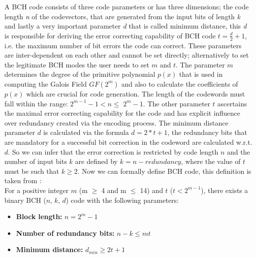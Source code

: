 A BCH code consists of three code parameters or has three dimensions; the code length \emph{n} of the codevectors, that are generated from the input bits of length \emph{k} and lastly a very important parameter \emph{d} that is called minimum distance, this \emph{d} is responsible for deriving the error correcting capability of BCH code $t = \frac{d}{2} + 1$, i.e. the maximum number of bit errors the code can correct. These parameters are inter-dependent on each other
and cannot be set directly; alternatively to set the legitimate BCH modes the user needs to set $m$ and $t$. The parameter $m$ determines the degree of the primitive polynomial $p(x)$ that is used in computing the Galois Field $GF(2^m)$ and also to calculate the coefficients of $p(x)$ which are crucial for code generation. The length of the codewords must fall within the range: $2^{m-1} - 1 < n \leq$ $2^m - 1$. The other parameter $t$ ascertains the maximal error correcting capability
for the code and has explicit influence over redundancy created via the encoding process. The minimum distance parameter $d$ is calculated via the formula $d = 2 * t + 1$, the redundancy bits that are mandatory for a successful bit correction in the codeword are calculated w.r.t. $d$. So we can infer that the error correction is restricted by code length $n$ and the number of input bits $k$ are defined by $k = n - redundancy$, where the value of $t$ must be such that $k \geq 2$. Now we can
formally define BCH code, this definition is taken from \cite{66}:\\

For a positive integer $m$ (m $\geq$ 4 and m $\leq$ 14) and $t$ ($t < 2^{m-1}$), there exists a binary BCH ($n$, $k$, $d$) code with the following parameters:
\begin{itemize}
\item \textbf{Block length:} $n = 2^m - 1$
\item \textbf{Number of redundancy bits:} $n - k \leq mt$
\item \textbf{Minimum distance:} $d_{min} \geq 2t + 1$
\end{itemize}

